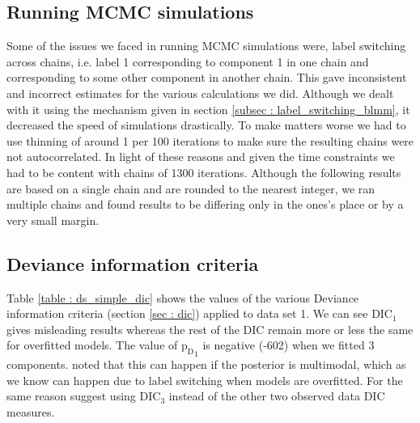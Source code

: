 \subsection{Running MCMC simulations}
Some of the issues we faced in running MCMC simulations were, label switching across chains, i.e. label 1 corresponding to component 1 in one chain and corresponding to some other component in another chain. This gave inconsistent and incorrect estimates for the various calculations we did. Although we dealt with it using the mechanism given in section \ref{subsec : label_switching_blmm}, it decreased the speed of simulations drastically. To make matters worse we had to use thinning of around 1 per 100 iterations to make sure the resulting chains were not autocorrelated. In light of these reasons and given the time constraints we had to be content with chains of 1300 iterations. Although the following results are based on a single chain and are rounded to the nearest integer, we ran multiple chains and found results to be differing only in the ones's place or by a very small margin.

\subsection{Deviance information criteria}
Table \ref{table : ds_simple_dic} shows the values of the various Deviance information criteria (section \ref{sec : dic}) applied to data set 1. We can see $\text{DIC}_1$ gives misleading results whereas the rest of the DIC remain more or less the same for overfitted models. The value of ${\text{p}_\text{D}}_1$ is negative (-602) when we fitted 3 components. \citet[pg. 161]{lunn_bugs_2012} noted that this can happen if the posterior is multimodal, which as we know can happen due to label switching when models are overfitted. For the same reason \citet{celeux_deviance_2006} suggest using $\text{DIC}_3$ instead of the other two observed data DIC measures.\\

